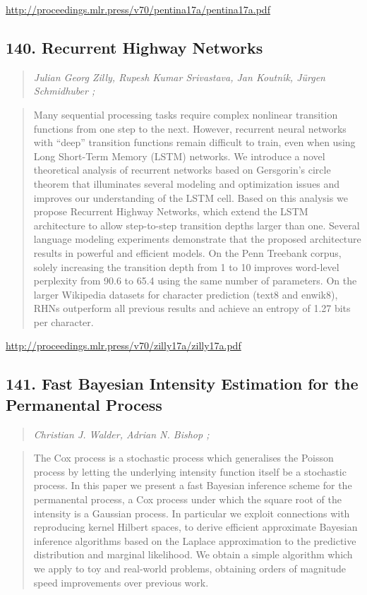 \documentclass{article}
\begin{document}
\href{http://proceedings.mlr.press/v70/pentina17a/pentina17a.pdf}{http://proceedings.mlr.press/v70/pentina17a/pentina17a.pdf}

\subsection{140. Recurrent Highway Networks}

\begin{quote}
\footnotesize{\textit{Julian Georg Zilly, Rupesh Kumar Srivastava, Jan Koutnı́k, Jürgen Schmidhuber ;}}
\end{quote}

\begin{quote}
    Many sequential processing tasks require complex nonlinear transition functions from one step to the next. However, recurrent neural networks with “deep” transition functions remain difficult to train, even when using Long Short-Term Memory (LSTM) networks. We introduce a novel theoretical analysis of recurrent networks based on Gersgorin’s circle theorem that illuminates several modeling and optimization issues and improves our understanding of the LSTM cell. Based on this analysis we propose Recurrent Highway Networks, which extend the LSTM architecture to allow step-to-step transition depths larger than one. Several language modeling experiments demonstrate that the proposed architecture results in powerful and efficient models. On the Penn Treebank corpus, solely increasing the transition depth from 1 to 10 improves word-level perplexity from 90.6 to 65.4 using the same number of parameters. On the larger Wikipedia datasets for character prediction (text8 and enwik8), RHNs outperform all previous results and achieve an entropy of 1.27 bits per character.  \end{quote}

\href{http://proceedings.mlr.press/v70/zilly17a/zilly17a.pdf}{http://proceedings.mlr.press/v70/zilly17a/zilly17a.pdf}

\subsection{141. Fast Bayesian Intensity Estimation for the Permanental Process}

\begin{quote}
\footnotesize{\textit{Christian J. Walder, Adrian N. Bishop ;}}
\end{quote}

\begin{quote}
    The Cox process is a stochastic process which generalises the Poisson process by letting the underlying intensity function itself be a stochastic process. In this paper we present a fast Bayesian inference scheme for the permanental process, a Cox process under which the square root of the intensity is a Gaussian process. In particular we exploit connections with reproducing kernel Hilbert spaces, to derive efficient approximate Bayesian inference algorithms based on the Laplace approximation to the predictive distribution and marginal likelihood. We obtain a simple algorithm which we apply to toy and real-world problems, obtaining orders of magnitude speed improvements over previous work.  \end{quote}
\end{document}
